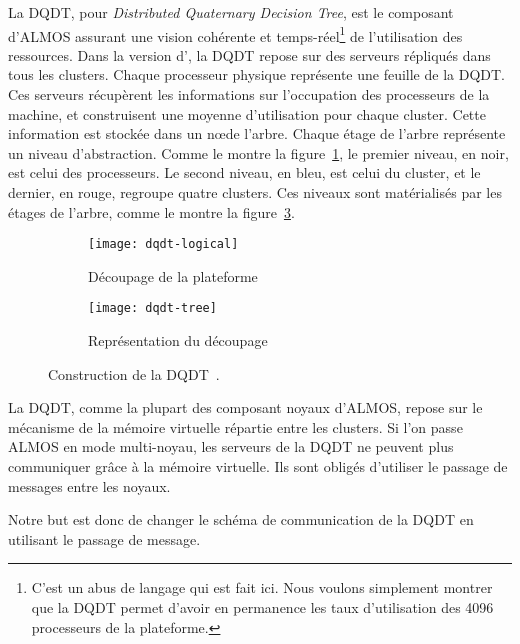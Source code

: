     La DQDT, pour \textit{Distributed Quaternary Decision Tree}, est le
    composant d'ALMOS assurant une vision cohérente et temps-réel\footnote{C'est
      un abus de langage qui est fait ici. Nous voulons simplement montrer que
      la DQDT permet d'avoir en permanence les taux d'utilisation des 4096
      processeurs de la plateforme.} de l'utilisation des ressources. Dans la
    version d'\citet{almaless2014universite}, la DQDT repose sur des serveurs
    répliqués dans tous les clusters. Chaque processeur physique représente une
    feuille de la DQDT. Ces serveurs récupèrent les informations sur
    l'occupation des processeurs de la machine, et construisent une moyenne
    d'utilisation pour chaque cluster. Cette information est stockée dans un
    n\oe de l'arbre. Chaque étage de l'arbre représente un niveau
    d'abstraction. Comme le montre la figure~\ref{fig:dqdt-logical}, le premier
    niveau, en noir, est celui des processeurs. Le second niveau, en bleu, est
    celui du cluster, et le dernier, en rouge, regroupe quatre clusters. Ces
    niveaux sont matérialisés par les étages de l'arbre, comme le montre la
    figure~\ref{fig:dqdt-tree}.\\

    \begin{figure}[ht]
      \begin{subfigure}[b]{0.5\textwidth}
        \texttt{[image: dqdt-logical]}
        \caption{Découpage de la plateforme}
        \label{fig:dqdt-logical}
      \end{subfigure}
      \begin{subfigure}[b]{0.4\textwidth}
        \texttt{[image: dqdt-tree]}
        \caption{Représentation du découpage}
        \label{fig:dqdt-tree}
      \end{subfigure}
      \caption{Construction de la DQDT~\citep{almaless2014universite}.}
    \end{figure}

    La DQDT, comme la plupart des composant noyaux d'ALMOS, repose sur le
    mécanisme de la mémoire virtuelle répartie entre les clusters. Si l'on passe
    ALMOS en mode multi-noyau, les serveurs de la DQDT ne peuvent plus
    communiquer grâce à la mémoire virtuelle. Ils sont obligés d'utiliser le
    passage de messages entre les noyaux.

    Notre but est donc de changer le schéma de communication de la DQDT en
    utilisant le passage de message.
